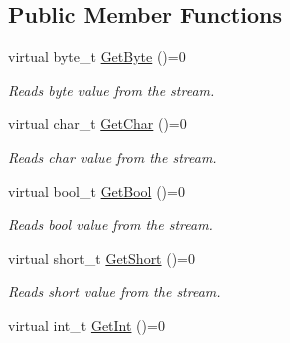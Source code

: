 \subsection*{Public Member Functions}
\begin{DoxyCompactItemize}
\item 
\hypertarget{class_common_1_1_de_serializer_aa2fff1fe5df35908ddcc262f2dc405ac}{virtual byte\-\_\-t \hyperlink{class_common_1_1_de_serializer_aa2fff1fe5df35908ddcc262f2dc405ac}{Get\-Byte} ()=0}\label{class_common_1_1_de_serializer_aa2fff1fe5df35908ddcc262f2dc405ac}

\begin{DoxyCompactList}\small\item\em Reads byte value from the stream. \end{DoxyCompactList}\item 
\hypertarget{class_common_1_1_de_serializer_aafef2f1bc360ca768e2d11dabe6a49e5}{virtual char\-\_\-t \hyperlink{class_common_1_1_de_serializer_aafef2f1bc360ca768e2d11dabe6a49e5}{Get\-Char} ()=0}\label{class_common_1_1_de_serializer_aafef2f1bc360ca768e2d11dabe6a49e5}

\begin{DoxyCompactList}\small\item\em Reads char value from the stream. \end{DoxyCompactList}\item 
\hypertarget{class_common_1_1_de_serializer_ad16f227270021a4db8a05bfd3f1b63bf}{virtual bool\-\_\-t \hyperlink{class_common_1_1_de_serializer_ad16f227270021a4db8a05bfd3f1b63bf}{Get\-Bool} ()=0}\label{class_common_1_1_de_serializer_ad16f227270021a4db8a05bfd3f1b63bf}

\begin{DoxyCompactList}\small\item\em Reads bool value from the stream. \end{DoxyCompactList}\item 
\hypertarget{class_common_1_1_de_serializer_ab6b26aa11a37f0e75becccddcc67dbdf}{virtual short\-\_\-t \hyperlink{class_common_1_1_de_serializer_ab6b26aa11a37f0e75becccddcc67dbdf}{Get\-Short} ()=0}\label{class_common_1_1_de_serializer_ab6b26aa11a37f0e75becccddcc67dbdf}

\begin{DoxyCompactList}\small\item\em Reads short value from the stream. \end{DoxyCompactList}\item 
\hypertarget{class_common_1_1_de_serializer_accf0be5bb4c6ae60c15d912863437789}{virtual int\-\_\-t \hyperlink{class_common_1_1_de_serializer_accf0be5bb4c6ae60c15d912863437789}{Get\-Int} ()=0}\label{class_common_1_1_de_serializer_accf0be5bb4c6ae60c15d912863437789}


\end{DoxyCompactItemize}
